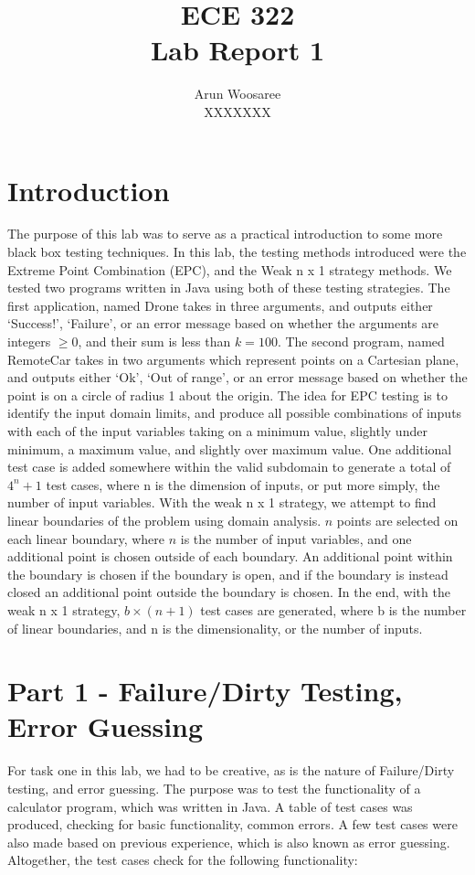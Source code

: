 \documentclass[letterpaper]{article}
\title{ECE 322 \\
Lab Report 1}
\author{Arun Woosaree\\
XXXXXXX}
\begin{document}
\maketitle
\section*{Introduction} The purpose of this lab was to serve as a practical
introduction to some more black box testing techniques. In this lab, the
testing methods introduced were the Extreme Point Combination (EPC), and the
Weak n x 1 strategy methods. We tested two programs written in Java using both
of these testing strategies. The first application, named Drone takes in three
arguments, and outputs either `Success!', `Failure', or an error message based
on whether the arguments are integers $\geq 0$, and their sum is less than
$k=100$. The second program, named RemoteCar takes in two arguments which
represent points on a Cartesian plane, and outputs either `Ok', `Out of range',
or an error message based on whether the point is on a circle of radius 1 about
the origin. The idea for EPC testing is to identify the input domain limits,
and produce all possible combinations of inputs with each of the input
variables taking on a minimum value, slightly under minimum, a maximum value,
and slightly over maximum value. One additional test case is added somewhere
within the valid subdomain to generate a total of $4^n + 1$ test cases, where
n is the dimension of inputs, or put more simply, the number of input
variables. With the weak n x 1 strategy, we attempt to find linear boundaries 
of the problem using domain analysis. $n$ points are selected on each linear
boundary, where $n$ is the number of input variables, and one additional point 
is chosen outside of each boundary. An additional point within the boundary is
chosen if the boundary is open, and if the boundary is instead closed an 
additional point outside the boundary is chosen. In the end, with the weak
n x 1 strategy, $b \times (n + 1)$ test cases are generated, where b is the 
number of linear boundaries, and n is the dimensionality, or the number of
inputs.

\section*{Part 1 - Failure/Dirty Testing, Error Guessing}
For task one in this lab, we had to be creative, as is the nature of Failure/Dirty testing, and error guessing.
The purpose was to test the functionality of a calculator program, which was written in Java. A table of
test cases was produced, checking for basic functionality, common errors. A few test cases were also
made based on previous experience, which is also known as error guessing. Altogether, the test cases check
for the following functionality:
\end{document}
